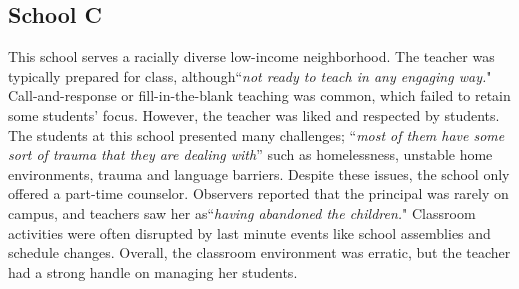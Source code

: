 \documentclass{sigchi}
\begin{document}

\subsection{School C}
This school serves a racially diverse low-income neighborhood. The teacher was typically prepared for class, although``\emph{not ready to teach in any engaging way.}" Call-and-response or fill-in-the-blank teaching was common, which failed to retain some students' focus. However, the teacher was liked and respected by students. The students at this school presented many challenges; ``\emph{most of them have some sort of trauma that they are dealing with}'' such as homelessness, unstable home environments, trauma and language barriers. Despite these issues, the school only offered a part-time counselor. Observers reported that the principal was rarely on campus, and teachers saw her as``\emph{having abandoned the children.}" Classroom activities were often disrupted by last minute events like school assemblies and schedule changes. Overall, the classroom environment was erratic, but the teacher had a strong handle on managing her students.
\end{document}
